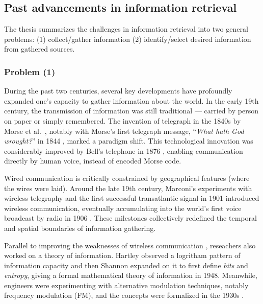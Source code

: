 \documentclass[final-report]{report-template}
\begin{document}
\subsection{Past advancements in information retrieval} 
\label{sec.info.ret.history}
The thesis summarizes the challenges in information retrieval into two general
problems: (1) collect/gather information (2) identify/select desired
information from gathered sources.

\subsubsection{Problem (1)}
During the past two centuries, several key developments have profoundly
expanded one's capacity to gather information about the world. In
the early 19th century, the transmission of information was still traditional
--- carried by person on paper or simply remembered. The invention of
telegraph in the 1840s by Morse et al.\ \cite{history.telegraph.1,
history.telegraph.2}, notably with Morse's first telegraph message,
``\emph{What hath God wrought?}'' in 1844 \cite{first.telegraph.msg}, marked a
paradigm shift. This technological innovation was considerably improved by
Bell's telephone in 1876 \cite{history.telephone.1, history.telephone.2},
enabling communication directly by human voice, instead of encoded Morse code.

Wired communication is critically constrained by geographical features (where
the wires were laid). Around the late 19th century, Marconi's experiments with
wireless telegraphy \cite{history.wireless.1} and the first successful
transatlantic signal in 1901 \cite{history.first.atlantic.broadcast} introduced
wireless communication, eventually accumulating into the world's first voice
broadcast by radio in 1906 \cite{first.voice.broadcast}. These milestones
collectively redefined the temporal and spatial boundaries of information
gathering.

Parallel to improving the weaknesses of wireless communication
\cite{wireless.weakness.1, wireless.weakness.2, wireless.weakness.3},
reseachers also worked on a theory of information.
Hartley observed a logritham pattern of information capacity
\cite{hartley.log.information} and then Shannon expanded on it to first define
\emph{bits} and \emph{entropy}, giving a formal mathematical theory of
information \cite{shannon.theory.communication} in 1948. Meanwhile,
engineers were experimenting with alternative modulation techniques, notably
frequency modulation (FM), and the concepts were formalized in the 1930s
\cite{history.modulation}. 
\end{document}
